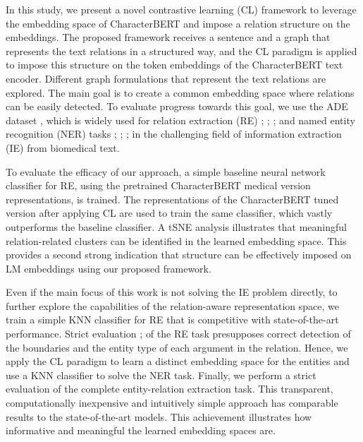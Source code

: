 \documentclass[11pt]{article}
\begin{document}
\par
In this study, we present a novel contrastive learning (CL) framework to leverage the embedding space of CharacterBERT and impose a relation structure on the embeddings. The proposed framework receives a sentence and a graph that represents the text relations in a structured way, and the CL paradigm is applied to impose this structure on the token embeddings of the CharacterBERT text encoder. Different graph formulations that represent the text relations are explored. The main goal is to create a common embedding space where relations can be easily detected. To evaluate progress towards this goal, we use the ADE dataset  \cite{gurulingappa2012development}, which is widely used for relation extraction (RE) \cite{zhao2005extracting}; \cite{jiang2007systematic}; \cite{sun2011semi}; \cite{plank2013embedding} and named entity recognition (NER) tasks \cite{curran2003language}; \cite{florian2006factorizing}; \cite{nadeau2007survey}; \cite{florian2010improving} in the challenging field of information extraction (IE) from biomedical text.

\par
To evaluate the efficacy of our approach, a simple baseline neural network classifier for RE, using the pretrained CharacterBERT medical version representations, is trained. The representations of the CharacterBERT tuned version after applying CL are used to train the same classifier, which vastly outperforms the baseline classifier. A tSNE \cite{van2008visualizing} analysis illustrates that meaningful relation-related clusters can be identified in the learned embedding space. This provides a second strong indication that structure can be effectively imposed on LM embeddings using our proposed framework.

\par
Even if the main focus of this work is not solving the IE problem directly, to further explore the capabilities of the relation-aware representation space, we train a simple KNN classifier for RE that is competitive with state-of-the-art performance. Strict evaluation \cite{bekoulis2018joint}; \cite{taille2020let} of the RE task presupposes correct detection of the boundaries and the entity type of each argument in the relation. Hence, we apply the CL paradigm to learn a distinct embedding space for the entities and use a KNN classifier to solve the NER task. Finally, we perform a strict evaluation of the complete entity-relation extraction task. This transparent, computationally inexpensive and intuitively simple approach has comparable results to the state-of-the-art models. This achievement illustrates how informative and meaningful the learned embedding spaces are.
\end{document}

